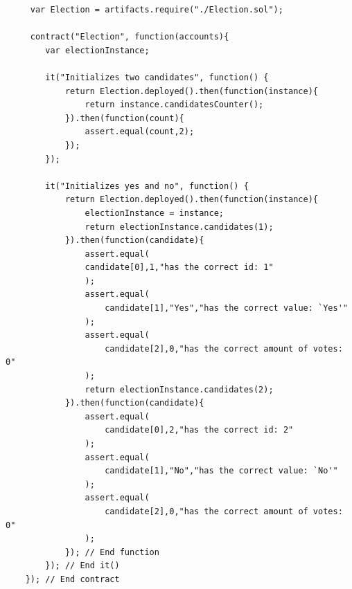 	
	 \lstset{language=JavaScriptSolidity} 
	 \begin{lstlisting}
	 var Election = artifacts.require("./Election.sol");
	 	
	 contract("Election", function(accounts){
		var electionInstance;
		 
		it("Initializes two candidates", function() {
		 	return Election.deployed().then(function(instance){
		 		return instance.candidatesCounter();
		 	}).then(function(count){
		 		assert.equal(count,2);
		 	});
	 	});
	 	
		it("Initializes yes and no", function() {
	 		return Election.deployed().then(function(instance){
	 			electionInstance = instance;
	 			return electionInstance.candidates(1);
	 		}).then(function(candidate){
				assert.equal(
			 	candidate[0],1,"has the correct id: 1"
			 	);
				assert.equal(
				 	candidate[1],"Yes","has the correct value: `Yes'"
				);
				assert.equal(
				 	candidate[2],0,"has the correct amount of votes: 0"
				);
				return electionInstance.candidates(2);
	 		}).then(function(candidate){
				assert.equal(
					candidate[0],2,"has the correct id: 2"
				);
				assert.equal(
					candidate[1],"No","has the correct value: `No'"
				);
				assert.equal(
					candidate[2],0,"has the correct amount of votes: 0"
				);
	 		}); // End function
	 	}); // End it()
	}); // End contract
	\end{lstlisting}
	








